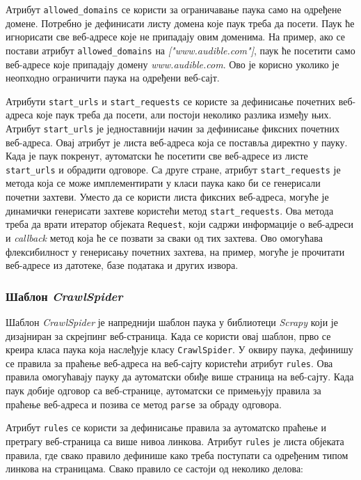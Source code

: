 \documentclass[12pt,oneside]{memoir}
\begin{document}
Атрибут \texttt{allowed\_domains} се користи за ограничавање паука само на одређене домене. Потребно је дефинисати листу домена које паук треба да посети. Паук ће игнорисати све веб-адресе које не припадају овим доменима. На пример, ако се постави атрибут \texttt{allowed\_domains} на \textit{["www.audible.com"]}, паук ће посетити само веб-адресе које припадају домену \textit{www.audible.com}. Ово је корисно уколико је неопходно ограничити паука на одређени веб-сајт.

Атрибути \texttt{start\_urls} и \texttt{start\_requests} се користе за дефинисање почетних веб-адреса које паук треба да посети, али постоји неколико разлика између њих. Атрибут \texttt{start\_urls} је једноставнији начин за дефинисање фиксних почетних веб-адреса. Овај атрибут је листа веб-адреса која се поставља директно у пауку. Када је паук покренут, аутоматски ће посетити све веб-адресе из листе \texttt{start\_urls} и обрадити одговоре. Са друге стране, атрибут \texttt{start\_requests} је метода која се може имплементирати у класи паука како би се генерисали почетни захтеви. Уместо да се користи листа фиксних веб-адреса, могуће је динамички генерисати захтеве користећи метод \texttt{start\_requests}. Ова метода треба да врати итератор објеката \texttt{Request}, који садржи информације о веб-адреси и \textit{callback} метод која ће се позвати за сваки од тих захтева.
Ово омогућава флексибилност у генерисању почетних захтева, на пример, могуће је прочитати веб-адресе из датотеке, базе података и других извора.

\subsubsection{Шаблон \textit{CrawlSpider}}
Шаблон \textit{CrawlSpider} је напреднији шаблон паука у библиотеци \textit{Scrapy} који је дизајниран за скрејпинг веб-страница. Када се користи овај шаблон, прво се креира класа паука која наслеђује класу \texttt{CrawlSpider}. У оквиру паука, дефинишу се правила за праћење веб-адреса на веб-сајту користећи атрибут \texttt{rules}. Ова правила омогућавају пауку да аутоматски обиђе више страница на веб-сајту. Када паук добије одговор са веб-странице, аутоматски се примењују правила за праћење веб-адреса и позива се метод \texttt{parse} за обраду одговора.

Атрибут \texttt{rules} се користи за дефинисање правила за аутоматско праћење и претрагу веб-страница са више нивоа линкова. Атрибут \texttt{rules} је листа објеката правила, где свако правило дефинише како треба поступати са одређеним типом линкова на страницама. Свако правило се састоји од неколико делова:  
\end{document}

